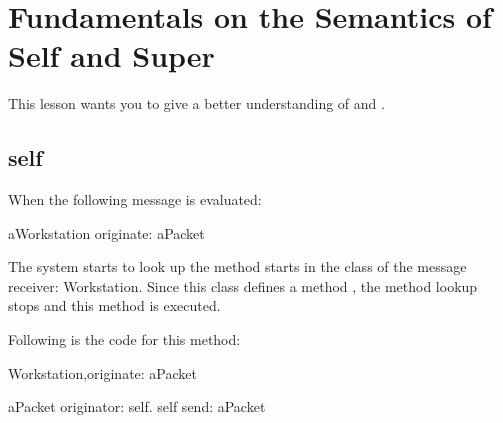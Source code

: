 
\ifx\wholebook\relax\else


\fi

\chapter{Fundamentals on the Semantics of Self and Super}


This lesson wants you to give a better understanding of  
and . 

\section{self}

When the following message is evaluated: 

\begin{scode}
aWorkstation originate: aPacket
\end{scode}

The system starts to look up the method  starts in 
the class of the message receiver: Workstation. Since this class 
defines a method , the method lookup stops and this 
method is executed.

Following is the code for this method:

\begin{scode}
Workstation\sep{}originate: aPacket

   aPacket originator: self.
   self send: aPacket
\end{scode}

